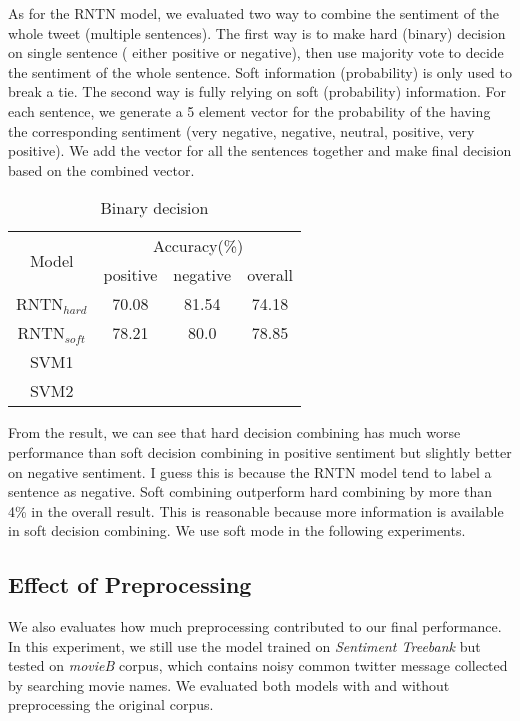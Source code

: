As for the RNTN model, we evaluated two way to combine the sentiment of the whole tweet (multiple sentences). The first way is to make hard (binary) decision on single sentence ( either positive or negative), then use majority vote to decide the sentiment of the whole sentence. Soft information (probability) is only used to break a tie. The second way is fully relying on soft (probability) information. For each sentence, we generate a 5 element vector for the probability of the having the corresponding sentiment (very negative, negative, neutral, positive, very positive). We add the vector for all the sentences together and make final decision based on the combined vector. 
\begin{table}[H]
  \begin{center}
    \begin{tabular}{cccc}\hline
      \multirow{2}{*}{Model} 
      & \multicolumn{3}{c}{Accuracy(\%)} \\\cline{2-4}
    & positive & negative & overall \\ \hline
    RNTN$_{hard}$  & 70.08 	    &  81.54       &  74.18     \\
    RNTN$_{soft}$  & 78.21     &   80.0	    &   78.85    \\ 
    SVM1  & ~        &          &         \\ 
    SVM2  & ~        &          &         \\ \hline
    \end{tabular}
    \end{center}
    \caption{\label{exp2_1} Binary decision}
\end{table}

From the result, we can see that hard decision combining has much worse performance than soft decision combining in positive sentiment but slightly better on negative sentiment. I guess this is because the RNTN model tend to label a sentence as negative. Soft combining outperform hard combining by more than 4\% in the overall result. This is reasonable because more information is available in soft decision combining. We use soft mode in the following experiments. 

\subsection{Effect of Preprocessing}
We also evaluates how much preprocessing contributed to our final performance. In this experiment, we still use the model trained on \textit{Sentiment Treebank} but tested on \textit{movieB} corpus, which contains noisy common twitter message collected by searching movie names. We evaluated both models with and without preprocessing the original corpus. 

